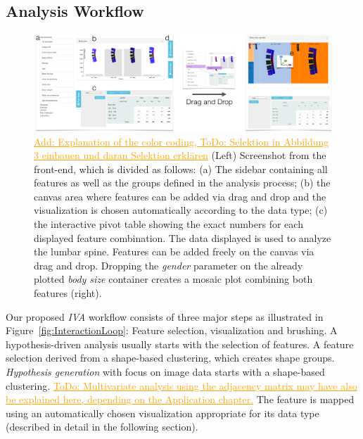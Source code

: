 \documentclass[journal]{style/vgtc} 			          %
\newcommand{\com}[1]{\textcolor{orange}{\uline{#1}}}
\begin{document}
\subsection{Analysis Workflow}
\begin{figure}[htb]
 \centering
 \includegraphics[width=1\textwidth, resolution=300]{figures/visualization}
 \caption{\com{Add: Explanation of the color coding, ToDo: Selektion in Abbildung 3 einbauen und daran Selektion erklären}
 (Left) Screenshot from the front-end, which is divided as follows: (a) The sidebar containing all features as well as the groups defined in the analysis process; (b) the canvas area where features can be added via drag and drop and the visualization is chosen automatically according to the data type; (c) the interactive pivot table showing the exact numbers for each displayed feature combination.
 The data displayed is used to analyze the lumbar spine. Features can be added freely on the canvas via drag and drop.
 Dropping the \emph{gender} parameter on the already plotted \emph{body size} container creates a mosaic plot combining both features (right).
 }
 \label{fig:visualization}
\end{figure}
Our proposed \emph{IVA} workflow consists of three major steps as illustrated in Figure~\ref{fig:InteractionLoop}: Feature selection, visualization and brushing.
%
A hypothesis-driven analysis usually starts with the selection of features.
%
A feature selection derived from a shape-based clustering, which creates shape groups.
%
\emph{Hypothesis generation} with focus on image data starts with a shape-based clustering.
%
\com{ToDo: Multivariate analysis using the adjacency matrix may have also be explained here, depending on the Application chapter.}
%
The feature is mapped using an automatically chosen visualization appropriate for its data type (described in detail in the following section).
\end{document}
